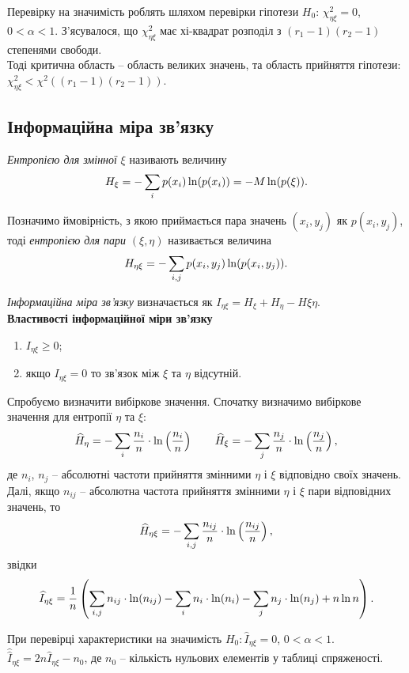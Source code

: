 Перевірку на значимість роблять шляхом перевірки гіпотези $H_0$: $\chi_{\eta\xi}^2=0$, $0<\alpha<1$. З'ясувалося, що $\chi_{\eta\xi}^2$ має хі-квадрат розподіл з $(r_1-1)(r_2-1)$ степенями свободи. \\

Тоді критична область -- область великих значень, та область прийняття гіпотези:
$\chi_{\eta\xi}^2 < \chi^2((r_1-1)(r_2-1))$.

\subsection{Інформаційна міра зв'язку}

\textit{Ентропією для змінної} $\xi$ називають величину \[H_\xi = - \displaystyle\sum\limits_i p(x_i) \ln (p(x_i)) = - M \ln (p(\xi)). \]

Позначимо ймовірність, з якою приймається пара значень $(x_i, y_j)$ як $p(x_i, y_j)$, тоді \textit{ентропією для пари} $(\xi, \eta)$ називається величина \[H_{\eta\xi} = - \displaystyle\sum\limits_{i,j} p(x_i, y_j) \ln (p(x_i, y_j)).\]

\textit{Інформаційна міра зв'язку} визначається як $I_{\eta\xi} = H_{\xi} + H_{\eta} - H{\xi\eta}$. \\

\textbf{Властивості інформаційної міри зв'язку}
\begin{enumerate}
	\item $I_{\eta\xi} \ge 0$;
	\item якщо $I_{\eta\xi} = 0$ то зв'язок між $\xi$ та $\eta$ відсутній.
\end{enumerate}

Спробуємо визначити вибіркове значення. Спочатку визначимо вибіркове значення для ентропії $\eta$ та $\xi$: \[ \widehat{H}_\eta = - \displaystyle\sum\limits_i \dfrac{n_i}{n} \cdot \ln \left(\dfrac{n_i}{n}\right) \qquad \widehat{H}_\xi = - \displaystyle\sum\limits_j \dfrac{n_j}{n} \cdot \ln \left(\dfrac{n_j}{n}\right), \] де $n_i$, $n_j$ -- абсолютні частоти прийняття змінними $\eta$ і $\xi$ відповідно своїх значень. Далі, якщо $n_{ij}$ -- абсолютна частота прийняття змінними $\eta$ і $\xi$ пари відповідних значень, то
\[\widehat{H}_{\eta\xi} = - \displaystyle\sum\limits_{i,j} \dfrac{n_{ij}}{n} \cdot \ln \left(\dfrac{n_{ij}}{n}\right),\] звідки \[ \widehat{I}_{\eta\xi} = \dfrac{1}{n} \left(\displaystyle\sum\limits_{i,j} n_{ij} \cdot \ln (n_{ij}) - \displaystyle\sum\limits_i n_i \cdot \ln (n_i) - \displaystyle\sum\limits_j n_j \cdot \ln (n_j) + n \ln n\right). \]

При перевірці характеристики на значимість $H_0: \widehat{I}_{\eta\xi}=0$, $0<\alpha<1$. $\widehat{\widehat{I}}_{\eta\xi} = 2n\widehat{I}_{\eta\xi} - n_0$, де $n_0$ -- кількість нульових елементів у таблиці спряженості. \\

